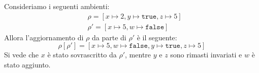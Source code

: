 \documentclass[a4paper]{article}
\begin{document}
\vspace{2em}
\noindent
\begin{example}
  Consideriamo i seguenti ambienti:
  \[
    \begin{aligned}
      &\rho = \left[ x \mapsto 2, y \mapsto \texttt{true}, z \mapsto 5 \right] \\
      &\rho' = \left[ x \mapsto 5, w \mapsto \texttt{false} \right]
    \end{aligned}
  \] 
  Allora l'aggiornamento di \( \rho \) da parte di \( \rho' \) è il seguente:
  \[
    \rho \left[ \rho' \right] =
    \left[ x \mapsto 5, w \mapsto \texttt{false}, y \mapsto \texttt{true}, z \mapsto 5 \right]
  \]
  Si vede che \( x \) è stato sovrascritto da \( \rho' \), mentre \( y \) e \( z \)
  sono rimasti invariati e \( w \) è stato aggiunto.
\end{example}
\end{document}
